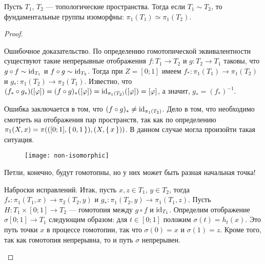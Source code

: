 \documentclass[main]{subfiles}
\begin{document}
\begin{theorem}
	Пусть $ T_1 $, $ T_2 $ --- топологические пространства. Тогда если $ T_1 \sim T_2 $, то фундаментальные группы
	изоморфны: $ \pi_1(T_1) \simeq \pi_1(T_2) $.
\end{theorem}

\begin{proof} \leavevmode
	\begin{phased}
		\item[Ошибочное доказательство.] По определению гомотопической эквивалентности существуют такие
			непрерывные отображения $ f \colon T_1 \to T_2 $ и $ g \colon T_2 \to T_1 $ таковы,
			что $ g \circ f \sim \operatorname{id}_{T_1} $ и $ f \circ g \sim \operatorname{id}_{T_2} $. Тогда при $ Z = [0; 1] $ имеем
			$ f_* \colon \pi_1(T_1) \to \pi_1(T_2) $ и $ g_* \colon \pi_1(T_2) \to \pi_2(T_1) $. Известно,
			что $ (f_* \circ g_*)([\varphi]) = (f \circ g)_*([\varphi]) = \operatorname{id}_{\pi_1(T_2)}([\varphi]) = [\varphi] $, а значит,
			$ g_* = (f_*)^{-1} $.

			Ошибка заключается в том, что $ (f \circ g)_* \neq \operatorname{id}_{\pi_1(T_2)} $. Дело
			в том, что необходимо смотреть на отображения пар пространств, так как по определению
			$ \pi_1(X, x) = \pi(([0; 1], \left\{\,0, 1\,\right\}), (X, \left\{\,x\,\right\})) $. В данном случае могла произойти такая ситуация.
			\begin{figure}[H]
				\centering \texttt{[image: non-isomorphic]}
			\end{figure}
			Петли, конечно, будут гомотопны, но у них может быть разная начальная точка!
		\item[Наброски исправлений.] Итак, пусть $ x, z \in T_1 $, $ y \in T_2 $, тогда
			$ f_* \colon \pi_1(T_1, x) \to \pi_2(T_2, y) $ и $ g_* \colon \pi_1(T_2, y) \to \pi_1(T_1, z) $.
			Пусть $ H \colon T_1 \times [0;1] \to T_2 $ --- гомотопия между $ g \circ f $ и $ \operatorname{id}_{T_1} $.
			Определим отображение $ \sigma [0; 1] \to T_1 $ следующим образом: для $ t \in [0; 1] $ положим
			$ \sigma(t) = h_t(x) $. Это путь точки $ x $ в процессе гомотопии, так что $ \sigma(0) = x $ и
			$ \sigma(1) = z $. Кроме того, так как гомотопия непрерывна, то и путь $ \sigma $ непрерывен.


\end{phased}
\end{proof}
\end{document}
